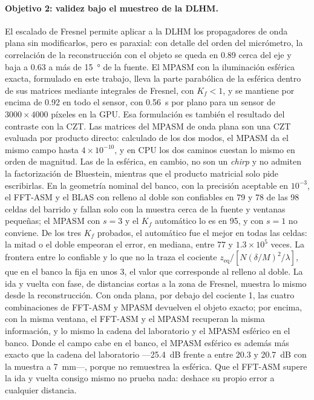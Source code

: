 \paragraph{Objetivo 2: validez bajo el muestreo de la DLHM.} El escalado de
Fresnel permite aplicar a la DLHM los propagadores de onda plana sin
modificarlos, pero es paraxial: con detalle del orden del micrómetro, la
correlación de la reconstrucción con el objeto se queda en 0.89 cerca del eje y
baja a 0.63 a más de \SI{15}{\degree} de la fuente. El MPASM con la
iluminación esférica exacta, formulado en este trabajo, lleva la parte
parabólica de la esférica dentro de sus matrices mediante integrales de
Fresnel, con $K_f < 1$, y se mantiene por encima de 0.92 en todo el sensor,
con \SI{0.56}{s} por plano para un sensor de $3000\times4000$ píxeles en la
GPU. Esa formulación es también el resultado del contraste con la CZT. Las
matrices del MPASM de onda plana son una CZT evaluada por producto directo:
calculado de los dos modos, el MPASM da el mismo campo hasta
$4\times10^{-10}$, y en CPU los dos caminos cuestan lo mismo en orden de
magnitud. Las de la esférica, en cambio, no son un \emph{chirp} y no admiten
la factorización de Bluestein, mientras que el producto matricial solo pide
escribirlas. En la
geometría nominal del banco, con la precisión aceptable en $10^{-3}$, el
FFT-ASM y el BLAS con relleno al doble son confiables en 79 y 78 de las 98
celdas del barrido y fallan solo con la muestra cerca de la fuente y ventanas
pequeñas; el MPASM con $s = 3$ y el $K_f$ automático lo es en 95, y con
$s = 1$ no conviene. De los tres $K_f$ probados, el automático fue el mejor en
todas las celdas: la mitad o el doble empeoran el error, en mediana, entre 77 y
$1.3\times10^{5}$ veces. La frontera entre lo confiable y lo que no la traza el
cociente $z_\mathrm{eq}/[N(\delta/M)^2/\lambda]$, que en el banco la fija en
unos 3, el valor que corresponde al relleno al doble. La ida y vuelta con
fase, de distancias cortas a la zona de Fresnel, muestra lo mismo desde la
reconstrucción. Con onda plana, por debajo del cociente 1, las cuatro
combinaciones de FFT-ASM y MPASM devuelven el objeto exacto; por encima, con la
misma ventana, el FFT-ASM y el MPASM recuperan la misma información, y lo mismo
la cadena del laboratorio y el MPASM esférico en el banco. Donde el campo cabe
en el banco, el MPASM esférico es además más exacto que la cadena del
laboratorio ---\SI{25.4}{dB} frente a entre 20.3 y \SI{20.7}{dB} con la
muestra a \SI{7}{mm}---, porque no remuestrea la esférica. Que el FFT-ASM
supere la ida y vuelta consigo mismo no prueba nada: deshace su propio error a
cualquier distancia.

